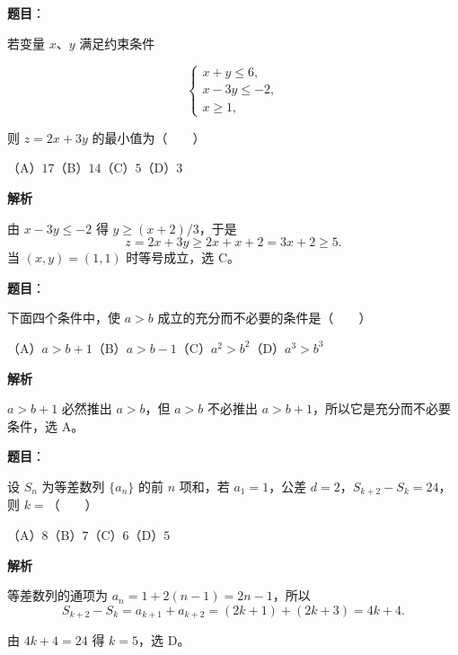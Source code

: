 \begin{answer}

\textbf{题目}：

若变量 $x\text{、}y$ 满足约束条件

\nopagebreak[4]
\[
\begin{cases}
x+y\leq6,\\
x-3y\leq-2,\\
x\geq1,
\end{cases}
\]

则 $z=2x+3y$ 的最小值为\mbox{（　　）}

（A）$17$\quad（B）$14$\quad（C）$5$\quad（D）$3$

\textbf{解析}

由 $x-3y\leq-2$ 得 $y\geq(x+2)/3$，于是
\nopagebreak[4]
\[
z=2x+3y\geq2x+x+2=3x+2\geq5.
\]
当 $(x,y)=(1,1)$ 时等号成立，选 C。


\end{answer}
\begin{answer}

\textbf{题目}：

下面四个条件中，使 $a>b$ 成立的充分而不必要的条件是\mbox{（　　）}

（A）$a>b+1$\quad（B）$a>b-1$\quad（C）$a^2>b^2$\quad（D）$a^3>b^3$

\textbf{解析}

$a>b+1$ 必然推出 $a>b$，但 $a>b$ 不必推出 $a>b+1$，所以它是充分而不必要条件，选 A。


\end{answer}
\begin{answer}

\textbf{题目}：

设 $S_n$ 为等差数列 $\{a_n\}$ 的前 $n$ 项和，若 $a_1=1$，公差 $d=2$，$S_{k+2}-S_k=24$，则 $k=$\mbox{（　　）}

（A）$8$\quad（B）$7$\quad（C）$6$\quad（D）$5$

\textbf{解析}

等差数列的通项为 $a_n=1+2(n-1)=2n-1$，所以
\nopagebreak[4]
\[
S_{k+2}-S_k=a_{k+1}+a_{k+2}
=(2k+1)+(2k+3)=4k+4.
\]

由 $4k+4=24$ 得 $k=5$，选 D。


\end{answer}
